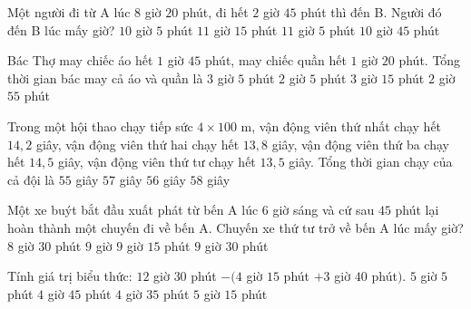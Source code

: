 \begin{ex} %
Một người đi từ A lúc $8$ giờ $20$ phút, đi hết $2$ giờ $45$ phút thì đến B. Người đó đến B lúc mấy giờ?
\choice
{$10$ giờ $5$ phút}
{$11$ giờ $15$ phút}
{\True $11$ giờ $5$ phút}
{$10$ giờ $45$ phút}
\end{ex}

\begin{ex} %
Bác Thợ may chiếc áo hết $1$ giờ $45$ phút, may chiếc quần hết $1$ giờ $20$ phút. Tổng thời gian bác may cả áo và quần là
\choice
{\True $3$ giờ $5$ phút}
{$2$ giờ $5$ phút}
{$3$ giờ $15$ phút}
{$2$ giờ $55$ phút}
\end{ex}

\begin{ex} %
Trong một hội thao chạy tiếp sức $4 \times 100\text{ m}$, vận động viên thứ nhất chạy hết $14{,}2$ giây, vận động viên thứ hai chạy hết $13{,}8$ giây, vận động viên thứ ba chạy hết $14{,}5$ giây, vận động viên thứ tư chạy hết $13{,}5$ giây. Tổng thời gian chạy của cả đội là
\choice
{$55$ giây}
{$57$ giây}
{\True $56$ giây}
{$58$ giây}
\end{ex}

\begin{ex} %
Một xe buýt bắt đầu xuất phát từ bến A lúc $6$ giờ sáng và cứ sau $45$ phút lại hoàn thành một chuyến đi về bến A. Chuyến xe thứ tư trở về bến A lúc mấy giờ?
\choice
{$8$ giờ $30$ phút}
{\True $9$ giờ}
{$9$ giờ $15$ phút}
{$9$ giờ $30$ phút}
\end{ex}

\begin{ex} %
Tính giá trị biểu thức: $12$ giờ $30$ phút $- (4$ giờ $15$ phút $+ 3$ giờ $40$ phút$)$.
\choice
{$5$ giờ $5$ phút}
{$4$ giờ $45$ phút}
{\True $4$ giờ $35$ phút}
{$5$ giờ $15$ phút}
\end{ex}

